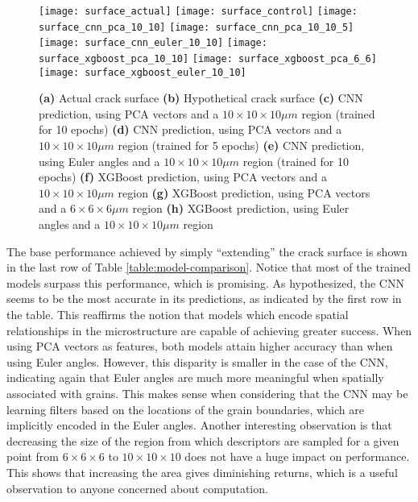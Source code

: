 \begin{figure}[b]
  \centering
    \texttt{[image: surface\_actual]} %
    \texttt{[image: surface\_control]} %
    \texttt{[image: surface\_cnn\_pca\_10\_10]} %
    \texttt{[image: surface\_cnn\_pca\_10\_10\_5]} %
    \texttt{[image: surface\_cnn\_euler\_10\_10]} %
    \texttt{[image: surface\_xgboost\_pca\_10\_10]} %
    \texttt{[image: surface\_xgboost\_pca\_6\_6]} %
    \texttt{[image: surface\_xgboost\_euler\_10\_10]} %
    \caption{\textbf{(a)} Actual crack surface
             \textbf{(b)} Hypothetical crack surface
             \textbf{(c)} CNN prediction, using PCA vectors and a $10 \times 10 \times 10 \mu m$ region (trained for 10 epochs)
             \textbf{(d)} CNN prediction, using PCA vectors and a $10 \times 10 \times 10 \mu m$ region (trained for 5 epochs)
             \textbf{(e)} CNN prediction, using Euler angles and a $10 \times 10 \times 10 \mu m$ region (trained for 10 epochs)
             \textbf{(f)} XGBoost prediction, using PCA vectors and a $10 \times 10 \times 10 \mu m$ region
             \textbf{(g)} XGBoost prediction, using PCA vectors and a $6 \times 6 \times 6 \mu m$ region
             \textbf{(h)} XGBoost prediction, using Euler angles and a $10 \times 10 \times 10 \mu m$ region }
    \label{fig:surfaces}
\end{figure}

The base performance achieved by simply ``extending'' the crack surface is shown in the last row of Table \ref{table:model-comparison}.  Notice that most of the trained models surpass this performance, which is promising.  As hypothesized, the CNN seems to be the most accurate in its predictions, as indicated by the first row in the table.  This reaffirms the notion that models which encode spatial relationships in the microstructure are capable of achieving greater success.  When using PCA vectors as features, both models attain higher accuracy than when using Euler angles.  However, this disparity is smaller in the case of the CNN, indicating again that Euler angles are much more meaningful when spatially associated with grains.  This makes sense when considering that the CNN may be learning filters based on the locations of the grain boundaries, which are implicitly encoded in the Euler angles.  Another interesting observation is that decreasing the size of the region from which descriptors are sampled for a given point from $6 \times 6 \times 6$ to $10 \times 10 \times 10$ does not have a huge impact on performance.  This shows that increasing the area gives diminishing returns, which is a useful observation to anyone concerned about computation.

